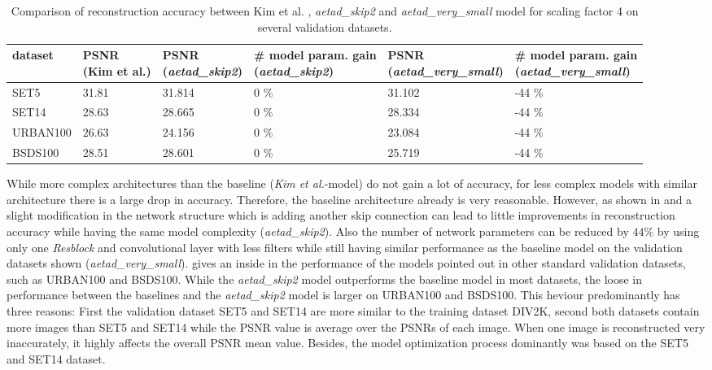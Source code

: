 \begin{table}[!htbp]
    \begin{center}
    \footnotesize
    \begin{tabular}{p{2cm}|p{2cm}|p{2cm}|p{3cm}|p{3cm}|p{3cm}}
    dataset & \pbox{2cm}{PSNR \\(Kim et al.)}
    & \pbox{2cm}{PSNR \\ (\textit{aetad\_skip2})}
    & \pbox{3cm}{\# model param. gain \\ (\textit{aetad\_skip2})}
    & \pbox{3cm}{PSNR \\ (\textit{aetad\_very\_small})}
    & \pbox{3cm}{\# model param. gain \\ (\textit{aetad\_very\_small})} \\
    \hline
    SET5 & 31.81 & 31.814 & 0 \% & 31.102 & -44 \% \\
    SET14 & 28.63 & 28.665 & 0 \% & 28.334 & -44 \% \\
    URBAN100 & 26.63 & 24.156 & 0 \% & 23.084 & -44 \% \\
    BSDS100 & 28.51 & 28.601 & 0 \% & 25.719 & -44 \% \\
    \end{tabular}
    \caption{Comparison of reconstruction accuracy between Kim et al. \cite{TAID},
    \textit{aetad\_skip2} and \textit{aetad\_very\_small}
    model for scaling factor 4 on several validation datasets. }
    \label{table:sisperformance}
    \normalsize
    \end{center}
\end{table}

While more complex architectures than the baseline (\textit{Kim et al.}-model) do not gain a lot of accuracy, for less complex models with similar architecture there is a large drop in accuracy. Therefore, the baseline architecture already is very reasonable. However, as shown in  and  a slight modification in the network structure which is adding another skip connection can lead to little improvements in reconstruction accuracy while having the same model complexity (\textit{aetad\_skip2}). Also the number of network parameters can be reduced by $44 \%$ by using only one \textit{Resblock} and convolutional layer with less filters while still having similar performance as the baseline model on the validation datasets shown (\textit{aetad\_very\_small}).  gives an inside in the performance of the models pointed out in other standard validation datasets, such as URBAN100 and BSDS100. While the \textit{aetad\_skip2} model outperforms the baseline model in most datasets, the loose in performance between the baselines and the \textit{aetad\_skip2} model is larger on URBAN100 and BSDS100. This heviour predominantly has three reasons: First the validation dataset SET5 and SET14 are more similar to the training dataset DIV2K, second both datasets contain more images than SET5 and SET14 while the PSNR value is average over the PSNRs of each image. When one image is reconstructed very inaccurately, it highly affects the overall PSNR mean value. Besides, the model optimization process dominantly was based on the SET5 and SET14 dataset. 

